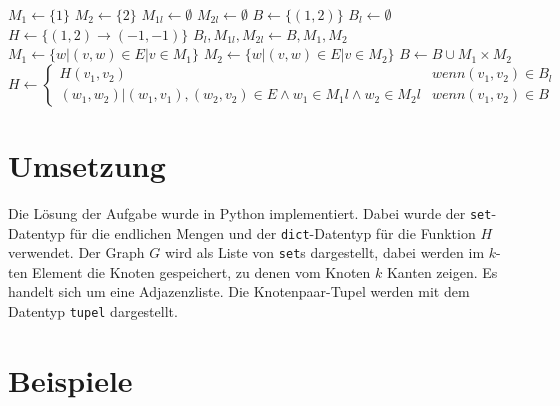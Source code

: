 \documentclass[a4paper,10pt,ngerman]{scrartcl}
\begin{document}
\begin{algorithmic}
  \State $M_1 \gets \{1\}$
  \State $M_2 \gets \{2\}$
  \State $M_{1l} \gets \emptyset$
  \State $M_{2l} \gets \emptyset$
  \State $B \gets \{(1, 2)\}$
  \State $B_l \gets \emptyset$
  \State $H \gets \{(1, 2) \rightarrow (-1, -1)\}$
  \State $B_l, M_{1l}, M_{2l} \gets B, M_1, M_2$
  \State $M_1 \gets \{w | (v, w) \in E | v \in M_1\} $
  \State $M_2 \gets \{w | (v, w) \in E | v \in M_2\} $
  \State $B \gets B \cup M_1 \times M_2$
  \State $H \gets \begin{cases}
      H(v_1, v_2)                                                                 & wenn (v_1,v_2) \in B_l \\
      (w_1, w_2)|(w_1,v_1), (w_2,v_2) \in E \land w_1 \in M_1l \land w_2 \in M_2l & wenn (v_1,v_2) \in B
    \end{cases}$
  \EndWhile
\end{algorithmic}
\section{Umsetzung}
Die Lösung der Aufgabe wurde in Python implementiert. Dabei wurde der
\lstinline|set|-Datentyp für die endlichen Mengen und der
\lstinline|dict|-Datentyp für die Funktion $H$ verwendet. Der Graph $G$ wird
als Liste von \lstinline|set|s dargestellt, dabei werden im $k$-ten Element die
Knoten gespeichert, zu denen vom Knoten $k$ Kanten zeigen. Es handelt sich um
eine Adjazenzliste. Die Knotenpaar-Tupel werden mit dem Datentyp
\lstinline|tupel| dargestellt. \\

\section{Beispiele}
\end{document}
